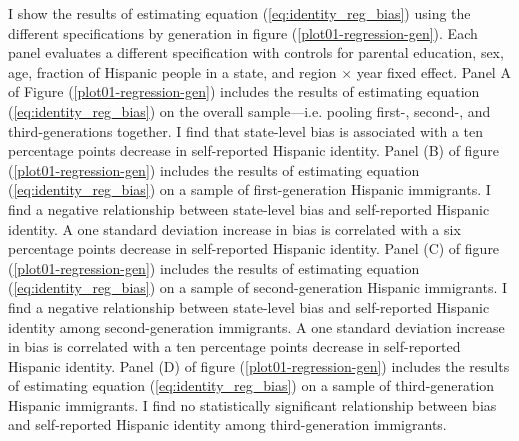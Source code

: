 \documentclass[12pt, fullpage]{article}
\begin{document}
I show the results of estimating equation (\ref{eq:identity_reg_bias}) using the different specifications by generation in figure (\ref{plot01-regression-gen}). Each panel evaluates a different specification with controls for parental education, sex, age, fraction of Hispanic people in a state, and region $\times$ year fixed effect. Panel A of Figure (\ref{plot01-regression-gen}) includes the results of estimating equation (\ref{eq:identity_reg_bias}) on the overall sample---i.e. pooling first-, second-, and third-generations together. I find that state-level bias is associated with a ten percentage points decrease in self-reported Hispanic identity. Panel (B) of figure (\ref{plot01-regression-gen}) includes the results of estimating equation (\ref{eq:identity_reg_bias}) on a sample of first-generation Hispanic immigrants. I find a negative relationship between state-level bias and self-reported Hispanic identity. A one standard deviation increase in bias is correlated with a six percentage points decrease in self-reported Hispanic identity. Panel (C) of figure (\ref{plot01-regression-gen}) includes the results of estimating equation (\ref{eq:identity_reg_bias}) on a sample of second-generation Hispanic immigrants. I find a negative relationship between state-level bias and self-reported Hispanic identity among second-generation immigrants. A one standard deviation increase in bias is correlated with a ten percentage points decrease in self-reported Hispanic identity. Panel (D) of figure (\ref{plot01-regression-gen}) includes the results of estimating equation (\ref{eq:identity_reg_bias}) on a sample of third-generation Hispanic immigrants. I find no statistically significant relationship between bias and self-reported Hispanic identity among third-generation immigrants. 
\end{document}
